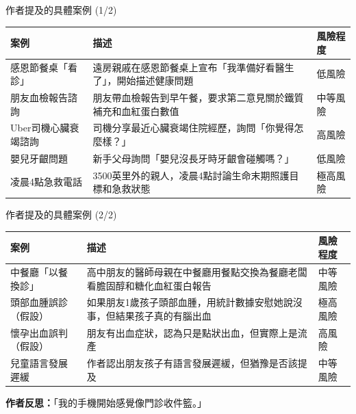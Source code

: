 \documentclass[aspectratio=169]{beamer}
\begin{document}
\begin{frame}{作者提及的具體案例 (1/2)}
\begin{table}[h]
\centering
\begin{tabular}{p{3cm}p{5.5cm}p{3cm}}
\toprule
\textbf{\textcolor{medblue}{案例}} & \textbf{\textcolor{medblue}{描述}} & \textbf{\textcolor{medblue}{風險程度}} \\
\midrule
感恩節餐桌「看診」 & 遠房親戚在感恩節餐桌上宣布「我準備好看醫生了」，開始描述健康問題 & \textcolor{medgray}{低風險} \\
\midrule
朋友血檢報告諮詢 & 朋友帶血檢報告到早午餐，要求第二意見關於鐵質補充和血紅蛋白數值 & \textcolor{medgray}{中等風險} \\
\midrule
Uber司機心臟衰竭諮詢 & 司機分享最近心臟衰竭住院經歷，詢問「你覺得怎麼樣？」 & \textcolor{medred}{高風險} \\
\midrule
嬰兒牙齦問題 & 新手父母詢問「嬰兒沒長牙時牙齦會碰觸嗎？」 & \textcolor{medgray}{低風險} \\
\midrule
凌晨4點急救電話 & 3500英里外的親人，凌晨4點討論生命末期照護目標和急救狀態 & \textcolor{medred}{極高風險} \\
\bottomrule
\end{tabular}
\end{table}
\end{frame}

\begin{frame}{作者提及的具體案例 (2/2)}
\begin{table}[h]
\centering
\begin{tabular}{p{3cm}p{5.5cm}p{3cm}}
\toprule
\textbf{\textcolor{medblue}{案例}} & \textbf{\textcolor{medblue}{描述}} & \textbf{\textcolor{medblue}{風險程度}} \\
\midrule
中餐廳「以餐換診」 & 高中朋友的醫師母親在中餐廳用餐點交換為餐廳老闆看膽固醇和糖化血紅蛋白報告 & \textcolor{medgray}{中等風險} \\
\midrule
頭部血腫誤診（假設） & 如果朋友1歲孩子頭部血腫，用統計數據安慰她說沒事，但結果孩子真的有腦出血 & \textcolor{medred}{極高風險} \\
\midrule
懷孕出血誤判（假設） & 朋友有出血症狀，認為只是點狀出血，但實際上是流產 & \textcolor{medred}{高風險} \\
\midrule
兒童語言發展遲緩 & 作者認出朋友孩子有語言發展遲緩，但猶豫是否該提及 & \textcolor{medgray}{中等風險} \\
\bottomrule
\end{tabular}
\end{table}

\vspace{0.3cm}
\textbf{\textcolor{medred}{作者反思：}}「我的手機開始感覺像門診收件籃。」
\end{frame}
\end{document}

